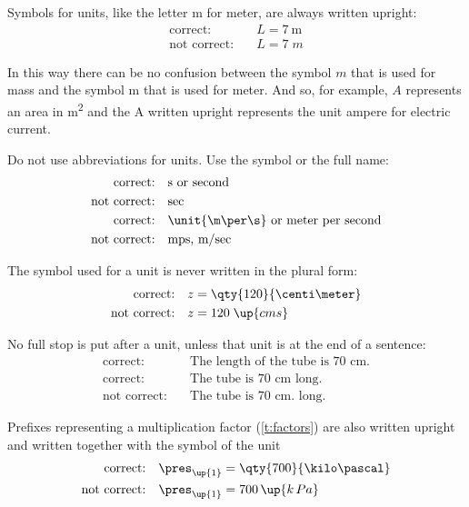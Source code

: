 Symbols for units, like the letter m for meter, are always written upright:
\begin{align*}
    \text{correct:} \quad & L = \qty{7}{\meter} \\
    \text{not correct:} \quad & L = 7 \; m
\end{align*}

In this way there can be no confusion between the symbol $m$ that is used for mass and the symbol m that is used for meter. And so, for example, $A$ represents an area in \unit{\square\meter} and the A written upright represents the unit ampere for electric current.

Do not use abbreviations for units. Use the symbol or the full name:
\begin{align*}
    \text{correct:}     \quad & \text{s or second} \\
    \text{not correct:} \quad & \text{sec}\\
    \text{correct:}     \quad & \text{\unit{\m\per\s} or meter per second} \\
    \text{not correct:} \quad & \text{mps, m/sec}
\end{align*}

The symbol used for a unit is never written in the plural form:
\begin{align*}
    \text{correct:} \quad & z = \qty{120}{\centi\meter}\\
    \text{not correct:} \quad & z = 120 \; \up{cms}
\end{align*}

No full stop is put after a unit, unless that unit is at the end of a sentence:
\begin{align*}
    \text{correct:} \quad & \text{The length of the tube is 70~cm.}\\
    \text{correct:} \quad & \text{The tube is 70~cm long.} \\
    \text{not correct:} \quad & \text{The tube is 70~cm. long.}
\end{align*}

Prefixes representing a multiplication factor (\cref{t:factors}) are also written upright and written together with the symbol of the unit
\begin{align*}
    \text{correct:} \quad & \pres_\up{1} = \qty{700}{\kilo\pascal} \\
    \text{not correct:} \quad & \pres_\up{1} = 700 \, \up{k \, Pa}
\end{align*}

